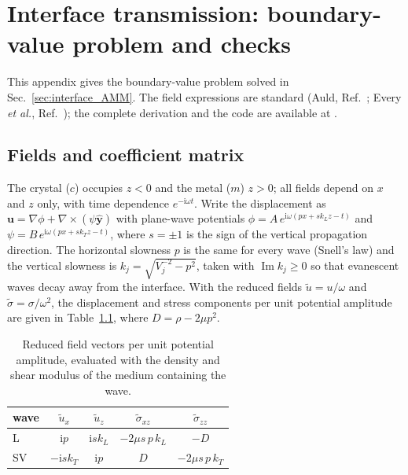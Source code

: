 \newcommand{\ii}{\mathrm{i}}

\chapter{Interface transmission: boundary-value problem and checks}
\label{app:interface_derivation}

This appendix gives the boundary-value problem solved in Sec.~\ref{sec:interface_AMM}. The
field expressions are standard (Auld, Ref.~\cite{Auld1973}; Every \emph{et al.},
Ref.~\cite{Every1984}); the complete derivation and the code are available at
.

\section{Fields and coefficient matrix}

The crystal ($c$) occupies $z<0$ and the metal ($m$) $z>0$; all fields depend on $x$ and $z$
only, with time dependence $e^{-\ii\omega t}$. Write the displacement as
$\mathbf u=\nabla\phi+\nabla\times(\psi\hat{\mathbf y})$ with plane-wave potentials
$\phi=A\,e^{\ii\omega(px+sk_Lz-t)}$ and $\psi=B\,e^{\ii\omega(px+sk_Tz-t)}$, where
$s=\pm1$ is the sign of the vertical propagation direction. The horizontal slowness $p$ is the
same for every wave (Snell's law) and the vertical slowness is
$k_j=\sqrt{V_j^{-2}-p^2}$, taken with $\operatorname{Im}k_j\ge0$ so that evanescent waves
decay away from the interface. With the reduced fields $\tilde u=u/\omega$ and
$\tilde\sigma=\sigma/\omega^2$, the displacement and stress components per unit potential
amplitude are given in Table~\ref{tab:fields}, where $D=\rho-2\mu p^2$.

\begin{table}[H]
\centering
\caption{Reduced field vectors per unit potential amplitude, evaluated with the density and
shear modulus of the medium containing the wave.}
\label{tab:fields}
\begin{tabular}{lcccc}
\toprule
wave & $\tilde u_x$ & $\tilde u_z$ & $\tilde\sigma_{xz}$ & $\tilde\sigma_{zz}$\\
\midrule
L  & $\ii p$ & $\ii s k_L$ & $-2\mu s\,p\,k_L$ & $-D$\\
SV & $-\ii s k_T$ & $\ii p$ & $D$ & $-2\mu s\,p\,k_T$\\
\bottomrule
\end{tabular}
\end{table}

